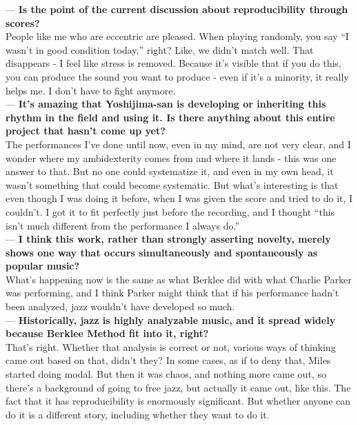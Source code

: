 \begin{description}
--- {\bf Is the point of the current discussion about reproducibility through scores?}\\

People like me who are eccentric are pleased. When playing randomly, you say ``I wasn't in good condition today,'' right? Like, we didn't match well. That disappears - I feel like stress is removed. Because it's visible that if you do this, you can produce the sound you want to produce - even if it's a minority, it really helps me. I don't have to fight anymore.\\

--- {\bf It's amazing that Yoshijima-san is developing or inheriting this rhythm in the field and using it. Is there anything about this entire project that hasn't come up yet?}\\

The performances I've done until now, even in my mind, are not very clear, and I wonder where my ambidexterity comes from and where it lands - this was one answer to that. But no one could systematize it, and even in my own head, it wasn't something that could become systematic. But what's interesting is that even though I was doing it before, when I was given the score and tried to do it, I couldn't. I got it to fit perfectly just before the recording, and I thought ``this isn't much different from the performance I always do.''\\

--- {\bf I think this work, rather than strongly asserting novelty, merely shows one way that occurs simultaneously and spontaneously as popular music?}\\

What's happening now is the same as what Berklee did with what Charlie Parker was performing, and I think Parker might think that if his performance hadn't been analyzed, jazz wouldn't have developed so much.\\

--- {\bf Historically, jazz is highly analyzable music, and it spread widely because Berklee Method fit into it, right?}\\

That's right. Whether that analysis is correct or not, various ways of thinking came out based on that, didn't they? In some cases, as if to deny that, Miles started doing modal. But then it was chaos, and nothing more came out, so there's a background of going to free jazz, but actually it came out, like this. The fact that it has reproducibility is enormously significant. But whether anyone can do it is a different story, including whether they want to do it.
\end{description}

